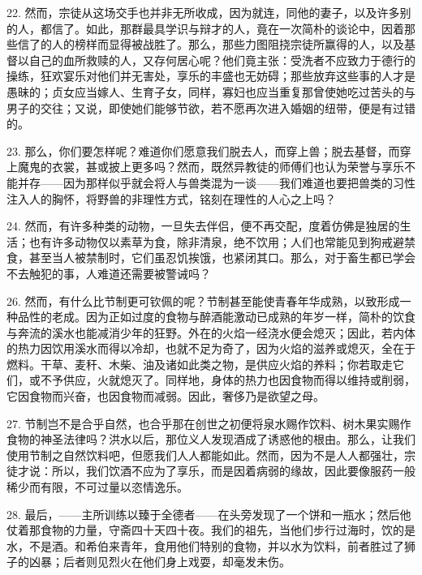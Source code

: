 22. 然而，宗徒从这场交手也并非无所收成，因为就连，同他的妻子，以及许多别的人，都信了。如此，那群最具学识与辩才的人，竟在一次简朴的谈论中，因着那些信了的人的榜样而显得被战胜了。那么，那些力图阻挠宗徒所赢得的人，以及基督以自己的血所救赎的人，又存何居心呢？他们竟主张：受洗者不应致力于德行的操练，狂欢宴乐对他们并无害处，享乐的丰盛也无妨碍；那些放弃这些事的人才是愚昧的；贞女应当嫁人、生育子女，同样，寡妇也应当重复那曾使她吃过苦头的与男子的交往；又说，即使她们能够节欲，若不愿再次进入婚姻的纽带，便是有过错的。\par

23. 那么，你们要怎样呢？难道你们愿意我们脱去人，而穿上兽；脱去基督，而穿上魔鬼的衣裳，甚或披上更多吗？然而，既然异教徒的师傅们也认为荣誉与享乐不能并存——因为那样似乎就会将人与兽类混为一谈——我们难道也要把兽类的习性注入人的胸怀，将野兽的非理性方式，铭刻在理性的人心之上吗？\par

24. 然而，有许多种类的动物，一旦失去伴侣，便不再交配，度着仿佛是独居的生活；也有许多动物仅以素草为食，除非清泉，绝不饮用；人们也常能见到狗戒避禁食，甚至当人被禁制时，它们虽忍饥挨饿，也紧闭其口。那么，对于畜生都已学会不去触犯的事，人难道还需要被警诫吗？\par

26. 然而，有什么比节制更可钦佩的呢？节制甚至能使青春年华成熟，以致形成一种品性的老成。因为正如过度的食物与醉酒能激动已成熟的年岁一样，简朴的饮食与奔流的溪水也能减消少年的狂野。外在的火焰一经浇水便会熄灭；因此，若内体的热力因饮用溪水而得以冷却，也就不足为奇了，因为火焰的滋养或熄灭，全在于燃料。干草、麦秆、木柴、油及诸如此类之物，是供应火焰的养料；你若取走它们，或不予供应，火就熄灭了。同样地，身体的热力也因食物而得以维持或削弱，它因食物而兴奋，也因食物而减弱。因此，奢侈乃是欲望之母。\par

27. 节制岂不是合乎自然，也合乎那在创世之初便将泉水赐作饮料、树木果实赐作食物的神圣法律吗？洪水以后，那位义人发现酒成了诱惑他的根由。那么，让我们使用节制之自然饮料吧，但愿我们人人都能如此。然而，因为不是人人都强壮，宗徒才说：所以，我们饮酒不应为了享乐，而是因着病弱的缘故，因此要像服药一般稀少而有限，不可过量以恣情逸乐。\par

28. 最后，——主所训练以臻于全德者——在头旁发现了一个饼和一瓶水；然后他仗着那食物的力量，守斋四十天四十夜。我们的祖先，当他们步行过海时，饮的是水，不是酒。和希伯来青年，食用他们特别的食物，并以水为饮料，前者胜过了狮子的凶暴；后者则见烈火在他们身上戏耍，却毫发未伤。\par

